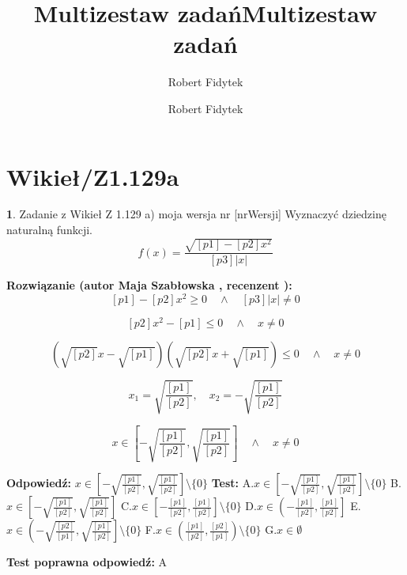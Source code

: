 \documentclass[12pt, a4paper]{article}
\title{Multizestaw zadań}
\author{Robert Fidytek}
\date{}\documentclass[12pt, a4paper]{article}
\title{Multizestaw zadań}
\author{Robert Fidytek}
\date{}
\theoremstyle{definition} %
\newtheorem{zad}{}
\theoremstyle{definition} %
\newtheorem{zad}{}
\newcommand{\kategoria}[1]{\section{#1}} %
\newcommand{\zadStart}[1]{\begin{zad}#1\newline} %
\newcommand{\zadStop}{\end{zad}}   %
\newcommand{\rozwStart}[2]{\noindent \textbf{Rozwiązanie (autor #1 , recenzent #2): }\newline} %
\newcommand{\rozwStop}{\newline}                                            %
\newcommand{\odpStart}{\noindent \textbf{Odpowiedź:}\newline}    %
\newcommand{\odpStop}{\newline}                                             %
\newcommand{\testStart}{\noindent \textbf{Test:}\newline} %
\newcommand{\testStop}{\newline} %
\newcommand{\kluczStart}{\noindent \textbf{Test poprawna odpowiedź:}\newline} %
\newcommand{\kluczStop}{\newline} %
\begin{document}
\maketitle


\kategoria{Wikieł/Z1.129a}
\zadStart{Zadanie z Wikieł Z 1.129 a) moja wersja nr [nrWersji]}
Wyznaczyć dziedzinę naturalną funkcji.
$$f(x)=\frac{\sqrt{[p1]-[p2]x^{2}}}{[p3]|x|}$$
\zadStop

\rozwStart{Maja Szabłowska}{}
$$[p1]-[p2]x^{2}\geq 0 \quad \land \quad [p3]|x|\neq0$$

$$[p2]x^{2}-[p1]\leq 0 \quad \land \quad x\neq0$$

$$(\sqrt{[p2]}x-\sqrt{[p1]})(\sqrt{[p2]}x+\sqrt{[p1]})\leq 0 \quad \land \quad x\neq0$$

$$x_{1}=\sqrt{\frac{[p1]}{[p2]}},\quad x_{2}=-\sqrt{\frac{[p1]}{[p2]}}$$

$$x\in\left[-\sqrt{\frac{[p1]}{[p2]}},\sqrt{\frac{[p1]}{[p2]}} \right]\quad \land \quad x\neq0$$

\rozwStop
\odpStart
$x\in\left[-\sqrt{\frac{[p1]}{[p2]}},\sqrt{\frac{[p1]}{[p2]}} \right]\setminus\{0\}$
\odpStop
\testStart
A.$x\in\left[-\sqrt{\frac{[p1]}{[p2]}},\sqrt{\frac{[p1]}{[p2]}} \right]\setminus\{0\}$
B.$x\in\left[-\sqrt{\frac{[p1]}{[p2]}},\sqrt{\frac{[p1]}{[p2]}} \right]$
C.$x\in\left[-\frac{[p1]}{[p2]},\frac{[p1]}{[p2]} \right]\setminus\{0\}$
D.$x\in\left(-\frac{[p1]}{[p2]},\frac{[p1]}{[p2]} \right]$
E.$x\in\left(-\sqrt{\frac{[p2]}{[p1]}},\sqrt{\frac{[p1]}{[p2]}} \right]\setminus\{0\}$
F.$x\in\left(\frac{[p1]}{[p2]},\frac{[p2]}{[p1]} \right)\setminus\{0\}$
G.$x\in\emptyset$

\testStop
\kluczStart
A
\kluczStop
\end{document}
